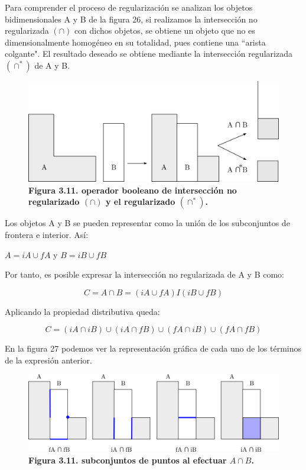 Para comprender el proceso de regularización se analizan los objetos bidimensionales A y B de la figura 26, si realizamos la intersección no regularizada $(\cap)$ con dichos objetos, se obtiene un objeto que no es dimensionalmente homogéneo en su totalidad, pues contiene una ``arista colgante". El resultado deseado se obtiene mediante la intersección regularizada $(\cap^*)$ de A y B.


\begin{figure}[h]
\includegraphics[width=12cm]{Img/GEO/geo-booleano3.jpg}
\centering
\caption{\textbf{Figura 3.11. \footnotesize{operador booleano de intersección no regularizado $(\cap)$ y el regularizado $(\cap^*)$.}}}
\end{figure}




Los objetos A y B se pueden representar como la unión de los subconjuntos de frontera e interior. Así:

\begin{center}
   $A = iA \cup fA$ y $B = iB \cup fB$
\end{center}

Por tanto, es posible expresar la intersección no regularizada de A y B como:

$$C = A \cap B = (iA \cup fA) I (iB \cup fB)$$ 

Aplicando la propiedad distributiva queda:

$$C = (iA \cap iB) \cup (iA \cap fB) \cup (fA \cap iB) \cup (fA \cap fB)$$

En la figura 27 podemos ver la representación gráfica de cada uno de los términos de la expresión anterior.

\begin{figure}[h]
\includegraphics[width=14cm]{Img/GEO/geo-booleano4.png}
\centering
\caption{\textbf{Figura 3.11. \footnotesize{subconjuntos de puntos al efectuar $A \cap B$.}}}
\end{figure}

